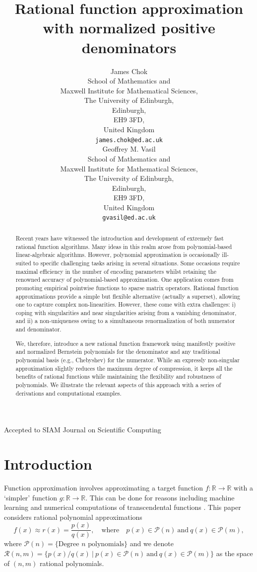 \documentclass{article}
\title{Rational function approximation with normalized positive denominators}
\author{
  \hspace{1mm}James Chok \\
  School of Mathematics and \\
  Maxwell Institute for Mathematical Sciences, \\
  The University of Edinburgh,\\
  Edinburgh,\\
  EH9 3FD, \\
  United Kingdom\\
  \texttt{james.chok@ed.ac.uk} \\
    \And
  Geoffrey M. Vasil \\
  School of Mathematics and \\
  Maxwell Institute for Mathematical Sciences, \\
  The University of Edinburgh,\\
  Edinburgh,\\
  EH9 3FD, \\
  United Kingdom\\
  \texttt{gvasil@ed.ac.uk} \\
}
\begin{document}
\maketitle

\begin{abstract}
Recent years have witnessed the introduction and development of extremely fast rational function algorithms. Many ideas in this realm arose from polynomial-based linear-algebraic algorithms. However, polynomial approximation is occasionally ill-suited to specific challenging tasks arising in several situations. Some occasions require maximal efficiency in the number of encoding parameters whilst retaining the renowned accuracy of polynomial-based approximation. One application comes from promoting empirical pointwise functions to sparse matrix operators. Rational function approximations provide a simple but flexible alternative (actually a superset), allowing one to capture complex non-linearities. However, these come with extra challenges: i) coping with singularities and near singularities arising from a vanishing denominator, and ii) a non-uniqueness owing to a simultaneous renormalization of both numerator and denominator. 

We, therefore, introduce a new rational function framework using manifestly positive and normalized Bernstein polynomials for the denominator and any traditional polynomial basis (e.g., Chebyshev) for the numerator. While an expressly non-singular approximation slightly reduces the maximum degree of compression, it keeps all the benefits of rational functions while maintaining the flexibility and robustness of polynomials. We illustrate the relevant aspects of this approach with a series of derivations and computational examples. 
\end{abstract}


Accepted to SIAM Journal on Scientific Computing

\section{Introduction}\label{sec:intro}
Function approximation involves approximating a target function $f:\mathbb{R}\to\mathbb{R}$ with a `simpler' function $g:\mathbb{R}\to\mathbb{R}$. This can be done for reasons including machine learning \cite{ml_1, ml_3, ml_4, ml_2} and numerical computations of transcendental functions \cite{transcendental_1, transcendental_2}. This paper considers rational polynomial approximations
\begin{equation}
    f(x)\approx r(x) = \frac{p(x)}{q(x)}, \quad\text{where}\quad p(x)\in\mathcal{P}(n)\ \text{and}\ q(x)\in\mathcal{P}(m),
\end{equation}
where $\mathcal{P}(n)=\{\text{Degree } n \text{ polynomials}\}$ and we denote $\mathcal{R}(n, m) = \{p(x)/q(x)\ |\ p(x)\in\mathcal{P}(n)\ \text{and}\ q(x)\in\mathcal{P}(m)\}$ as the space of $(n,m)$ rational polynomials. 
\end{document}
